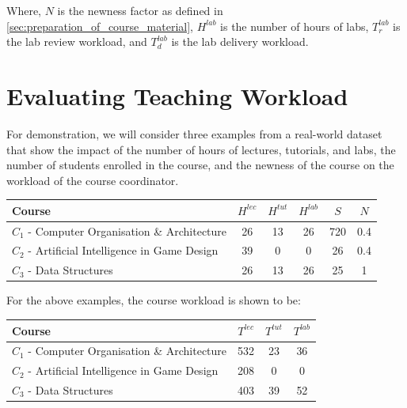 Where, \(N\) is the newness factor as defined in \autoref{sec:preparation_of_course_material}, \(H^{lab}\) is the number of hours of labs, \(T_r^{lab}\) is the lab review workload, and \(T_d^{lab}\) is the lab delivery workload.

\section{Evaluating Teaching Workload}
\label{sec:workload_demo}

For demonstration, we will consider three examples from a real-world dataset that show the impact of the number of hours of lectures, tutorials, and labs, the number of students enrolled in the course, and the newness of the course on the workload of the course coordinator.

\begin{table}[H]
  \centering
  \begin{tabular}{|l|c|c|c|c|c|}
    \hline
    \textbf{Course}                                  & \(H^{lec}\) & \(H^{tut}\) & \(H^{lab}\) & \(S\) & \(N\) \\\hline
    \(C_1\) - Computer Organisation \& Architecture  & 26          & 13          & 26          & 720   & 0.4   \\\hline
    \(C_2\) - Artificial Intelligence in Game Design & 39          & 0           & 0           & 26    & 0.4   \\\hline
    \(C_3\) - Data Structures                        & 26          & 13          & 26          & 25    & 1     \\\hline
  \end{tabular}
\end{table}

For the above examples, the course workload is shown to be:

\begin{table}[H]
  \centering
  \begin{tabular}{|l|c|c|c|}
    \hline
    \textbf{Course}                                  & \(T^{lec}\) & \(T^{tut}\) & \(T^{lab}\) \\\hline
    \(C_1\) - Computer Organisation \& Architecture  & 532         & 23          & 36          \\\hline
    \(C_2\) - Artificial Intelligence in Game Design & 208         & 0           & 0           \\\hline
    \(C_3\) - Data Structures                        & 403         & 39          & 52          \\\hline
  \end{tabular}
\end{table}

